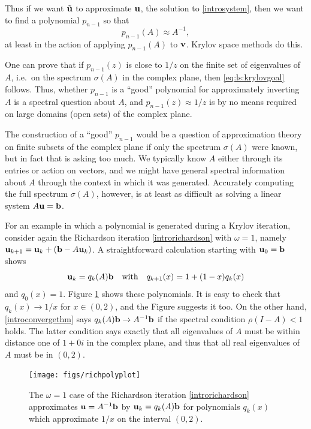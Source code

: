 Thus if we want $\tilde{\mathbf{u}}$ to approximate $\mathbf{u}$, the solution to \eqref{introsystem}, then we want to find a polynomial $p_{n-1}$ so that
\begin{equation}
    p_{n-1}(A) \approx A^{-1},  \label{eq:ls:krylovgoal}
\end{equation}
at least in the action of applying $p_{n-1}(A)$ to $\mathbf{v}$.  Krylov space methods do this.

One can prove that if $p_{n-1}(z)$ is close to $1/z$ on the finite set of eigenvalues of $A$, i.e.~on the spectrum $\sigma(A)$ in the complex plane, then \eqref{eq:ls:krylovgoal} follows.  Thus, whether $p_{n-1}$ is a ``good'' polynomial for approximately inverting $A$ is a spectral question about $A$, and $p_{n-1}(z) \approx 1/z$ is by no means required on large domains (open sets) of the complex plane.

The construction of a ``good'' $p_{n-1}$ would be a question of approximation theory on finite subsets of the complex plane if only the spectrum $\sigma(A)$ were known, but in fact that is asking too much.  We typically know $A$ either through its entries or action on vectors, and we might have general spectral information about $A$ through the context in which it was generated.   Accurately computing the full spectrum $\sigma(A)$, however, is at least as difficult as solving a linear system $A\mathbf{u}=\mathbf{b}$.

For an example in which a polynomial is generated during a Krylov iteration, consider again the Richardson iteration \eqref{introrichardson} with $\omega=1$, namely $\mathbf{u}_{k+1} = \mathbf{u}_k + (\mathbf{b} - A \mathbf{u}_k)$.  A straightforward calculation starting with $\mathbf{u}_0=\mathbf{b}$ shows
\begin{equation}
	\mathbf{u}_k = q_k(A) \mathbf{b} \quad \text{with} \quad q_{k+1}(x) = 1 + (1-x) q_k(x)  \label{richpolys}
\end{equation}
and $q_0(x)=1$.
Figure \ref{fig:richpolyplot} shows these polynomials.  It is easy to check that $q_k(x) \to 1/x$ for $x\in (0,2)$, and the Figure suggests it too.  On the other hand, \eqref{introconvergethm} says $q_k(A) \mathbf{b} \to A^{-1} \mathbf{b}$ if the spectral condition $\rho(I-A)<1$ holds.  The latter condition says exactly that all eigenvalues of $A$ must be within distance one of $1+0i$ in the complex plane, and thus that all real eigenvalues of $A$ must be in $(0,2)$.

\begin{figure}
\bigskip
\texttt{[image: figs/richpolyplot]}
\caption{The $\omega=1$ case of the Richardson iteration \eqref{introrichardson} approximates $\mathbf{u}=A^{-1}\mathbf{b}$ by $\mathbf{u}_k=q_k(A)\mathbf{b}$ for polynomials $q_k(x)$ which approximate $1/x$ on the interval $(0,2)$.}
\label{fig:richpolyplot}
\end{figure}

